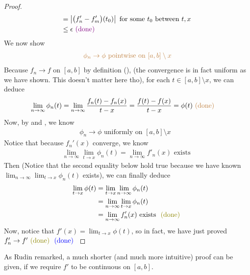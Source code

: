 \documentclass{report}
\begin{document}
\begin{proof}
\begin{align*}
 &=\left|\big(f'_n-f'_m\big)(t_0)\right|\text{ for some $t_0$ between $t,x$  }\\
&\leq \epsilon \textcolor{violet}{\text{ (done) }}
\end{align*}
We now show 
\begin{align}
\label{UCACP}
\textcolor{brown}{\phi_n \to \phi\text{ pointwise on $[a,b]\setminus x$}}
\end{align}
Because $f_n \to f$ on $[a,b]$ by definition (), (the convergence is in fact uniform as we have shown. This doesn't matter here tho), for each $t \in [a,b]\setminus x$, we can deduce
\begin{align*}
\lim_{n\to \infty} \phi_n(t)&=\lim_{n\to \infty}\frac{f_n(t)-f_n(x)}{t-x}=\frac{f(t)-f(x)}{t-x}=\phi (t)\textcolor{brown}{\text{ (done) }}
\end{align*}
Now, by  and , we know 
\begin{align*}
\phi_n \to \phi \text{ uniformly on $[a,b]\setminus x$ }
\end{align*}
Notice that because $f_n'(x)$ converge, we know
\begin{align*}
\lim_{n\to \infty}\lim_{t\to x}\phi_n(t)=\lim_{n\to \infty}f'_n(x)\text{ exists }
\end{align*}
Then (Notice that the second equality below hold true because we have known $\lim_{n\to \infty}\lim_{t\to x}\phi_n(t)$ exists), we can finally deduce 
\begin{align*}
\lim_{t\to x}\phi (t)&=\lim_{t\to x}\lim_{n\to \infty}\phi_n(t)\\
&=\lim_{n\to \infty}\lim_{t\to x}\phi_n(t)\\
&=\lim_{n\to \infty}f'_n(x)\text{ exists }\odone
\end{align*}
Now, notice that $f'(x)=\lim_{t\to x}\phi (t)$, so in fact, we have just proved $f'_n \to f'\odone \bdone$



\end{proof}
\begin{mdframed}
As Rudin remarked, a much shorter (and much more intuitive) proof can be given, if we require $f'$ to be continuous on  $[a,b]$. 
\end{mdframed}
\end{document}
